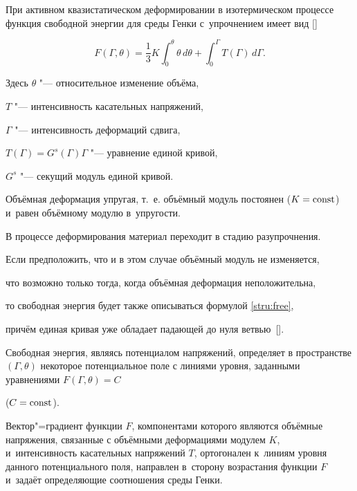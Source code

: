 \smallskip



 При активном квазистатическом деформировании в изотермическом процессе функция свободной энергии для среды Генки с~упрочнением имеет вид []

\begin{equation}

F(\Gamma, \theta)=\frac13 K\int_0^\theta \theta\,d\theta +\int_0^\Gamma T(\Gamma)\,d\Gamma. \label{stru:free}

\end{equation}

Здесь $\theta$ "--- относительное изменение объёма, 

$T$ "--- интенсивность касательных напряжений, 

$\Gamma$ "--- интенсивность деформаций сдвига, 

$T(\Gamma)=G^{s}(\Gamma)\Gamma$ "--- уравнение единой кривой, 

$G^s$ "--- секущий модуль единой кривой. 

Объёмная деформация упругая, т.~е. объёмный модуль постоянен ($K=\rm const$) и~равен объёмному модулю в~упругости.



В процессе деформирования материал переходит в стадию разупрочнения. 

Если предположить, что и в этом случае объёмный модуль не изменяется, 

что возможно только тогда, когда объёмная деформация неположительна, 

то свободная энергия будет также описываться формулой \eqref{stru:free}, 

причём единая кривая уже обладает падающей до нуля ветвью~[].



Свободная энергия, являясь потенциалом напряжений, определяет в пространстве $(\Gamma, \theta)$ некоторое потенциальное поле с линиями уровня, заданными уравнениями $F(\Gamma,\theta)=C$ 

($C =\rm const$). 

Вектор"=градиент функции $F$, компонентами которого являются объёмные напряжения, связанные с объёмными деформациями модулем $K$, и~интенсивность касательных напряжений $T$, ортогонален  к~линиям уровня данного потенциального поля, направлен в~сторону возрастания функции $F$ и~задаёт определяющие соотношения среды Генки.



